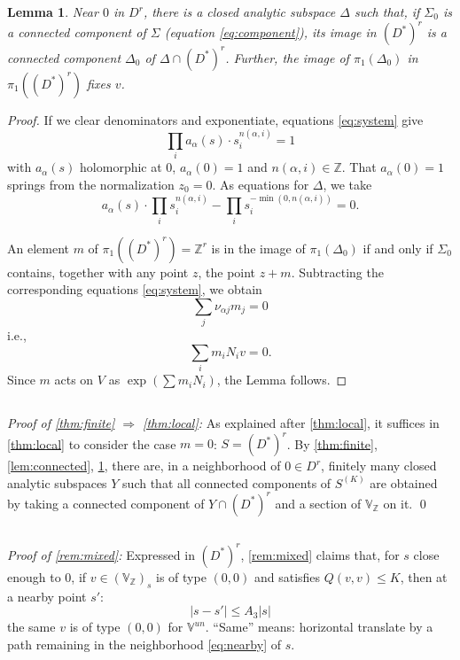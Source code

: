 \documentclass[11pt,a4paper]{article}
\theoremstyle{plain}
\newtheorem{lemma}[theorem]{Lemma}
\theoremstyle{definition}
\begin{document}
\begin{lemma}\label{lem:analytic}
Near $0$ in $D^r$, there is a closed analytic subspace $\Delta$ such that, if $\Sigma_0$ is a connected component of $\Sigma$ (equation \eqref{eq:component}), its image in $(D^*)^r$ is a connected component $\Delta_0$ of $\Delta\cap (D^*)^r$. Further, the image of $\pi_1(\Delta_0)$ in $\pi_1((D^*)^r)$ fixes $v$.
\end{lemma}

\begin{proof}
If we clear denominators and exponentiate, equations \eqref{eq:system} give
\[
\prod_i a_{\alpha}(s)\cdot s_i^{n(\alpha,i)}=1
\]
with $a_{\alpha}(s)$ holomorphic at $0$, $a_{\alpha}(0)=1$ and $n(\alpha,i)\in\mathbb{Z}$. That $a_{\alpha}(0)=1$ springs from the normalization $z_0=0$. As equations for $\Delta$, we take
\[
a_{\alpha}(s)\cdot\prod_i s_i^{n(\alpha,i)}-\prod_i s_i^{-\min(0,n(\alpha,i))}=0.
\]

An element $m$ of $\pi_1((D^*)^r)=\mathbb{Z}^r$ is in the image of $\pi_1(\Delta_0)$ if and only if $\Sigma_0$ contains, together with any point $z$, the point $z+m$. Subtracting the corresponding equations \eqref{eq:system}, we obtain
\[
\sum_j \nu_{\alpha j} m_j=0
\]
i.e.,
\[
\sum_i m_i N_i v=0.
\]
Since $m$ acts on $V$ as $\exp(\sum m_i N_i)$, the Lemma follows.
\end{proof}

\subsection{}
\textit{Proof of \ref{thm:finite} $\Rightarrow$ \ref{thm:local}:} As explained after \ref{thm:local}, it suffices in \ref{thm:local} to consider the case $m=0$: $S=(D^*)^r$. By \ref{thm:finite}, \ref{lem:connected}, \ref{lem:analytic}, there are, in a neighborhood of $0\in D^r$, finitely many closed analytic subspaces $Y$ such that all connected components of $S^{(K)}$ are obtained by taking a connected component of $Y\cap(D^*)^r$ and a section of $\mathbb{V}_{\mathbb{Z}}$ on it. \qed

\subsection{}
\textit{Proof of \ref{rem:mixed}:} Expressed in $(D^*)^r$, \ref{rem:mixed} claims that, for $s$ close enough to $0$, if $v\in(\mathbb{V}_{\mathbb{Z}})_s$ is of type $(0,0)$ and satisfies $Q(v,v)\leq K$, then at a nearby point $s'$:
\begin{equation}\label{eq:nearby}
|s-s'|\leq A_3|s|
\end{equation}
the same $v$ is of type $(0,0)$ for $\mathbb{V}^{un}$. ``Same'' means: horizontal translate by a path remaining in the neighborhood \eqref{eq:nearby} of $s$.
\end{document}
